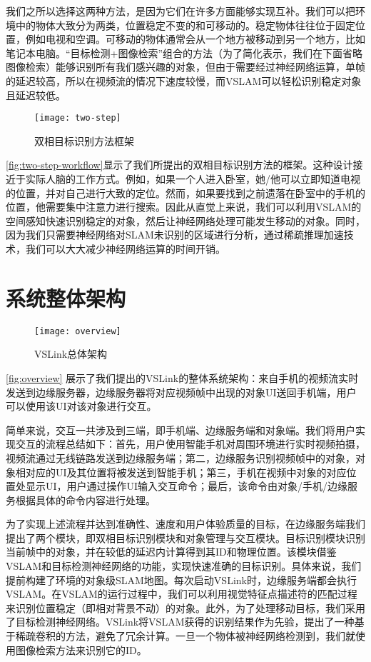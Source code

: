   我们之所以选择这两种方法，是因为它们在许多方面能够实现互补。我们可以把环境中的物体大致分为两类，位置稳定不变的和可移动的。稳定物体往往位于固定位置，例如电视和空调。可移动的物体通常会从一个地方被移动到另一个地方，比如笔记本电脑。“目标检测+图像检索”组合的方法（为了简化表示，我们在下面省略图像检索）能够识别所有我们感兴趣的对象，但由于需要经过神经网络运算，单帧的延迟较高，所以在视频流的情况下速度较慢，而VSLAM可以轻松识别稳定对象且延迟较低。
  
  \begin{figure}[htbp]
	\centering
	\texttt{[image: two-step]}
	\caption{双相目标识别方法框架}
	\label{fig:two-step-workflow}
  \end{figure}
  
  \autoref{fig:two-step-workflow}显示了我们所提出的双相目标识别方法的框架。这种设计接近于实际人脑的工作方式。例如，如果一个人进入卧室，她/他可以立即知道电视的位置，并对自己进行大致的定位。然而，如果要找到之前遗落在卧室中的手机的位置，他需要集中注意力进行搜索。因此从直觉上来说，我们可以利用VSLAM的空间感知快速识别稳定的对象，然后让神经网络处理可能发生移动的对象。同时，因为我们只需要神经网络对SLAM未识别的区域进行分析，通过稀疏推理加速技术，我们可以大大减少神经网络运算的时间开销。

\section{系统整体架构}
\label{sec:arch}

\begin{figure}[htbp]
	\centering
	\texttt{[image: overview]}
	\caption{VSLink总体架构}
	\label{fig:overview}
\end{figure}

\autoref{fig:overview} 展示了我们提出的VSLink的整体系统架构：来自手机的视频流实时发送到边缘服务器，边缘服务器将对应视频帧中出现的对象UI送回手机端，用户可以使用该UI对该对象进行交互。

简单来说，交互一共涉及到三端，即手机端、边缘服务端和对象端。我们将用户实现交互的流程总结如下：首先，用户使用智能手机对周围环境进行实时视频拍摄，视频流通过无线链路发送到边缘服务端；第二，边缘服务识别视频帧中的对象，对象相对应的UI及其位置将被发送到智能手机；第三，手机在视频中对象的对应位置处显示UI，用户通过操作UI输入交互命令；最后，该命令由对象/手机/边缘服务根据具体的命令内容进行处理。

为了实现上述流程并达到准确性、速度和用户体验质量的目标，在边缘服务端我们提出了两个模块，即双相目标识别模块和对象管理与交互模块。目标识别模块识别当前帧中的对象，并在较低的延迟内计算得到其ID和物理位置。该模块借鉴VSLAM和目标检测神经网络的功能，实现快速准确的目标识别。具体来说，我们提前构建了环境的对象级SLAM地图。每次启动VSLink时，边缘服务端都会执行VSLAM。在VSLAM的运行过程中，我们可以利用视觉特征点描述符的匹配过程来识别位置稳定（即相对背景不动）的对象。此外，为了处理移动目标，我们采用了目标检测神经网络。VSLink将VSLAM获得的识别结果作为先验，提出了一种基于稀疏卷积的方法，避免了冗余计算。一旦一个物体被神经网络检测到，我们就使用图像检索方法来识别它的ID。

